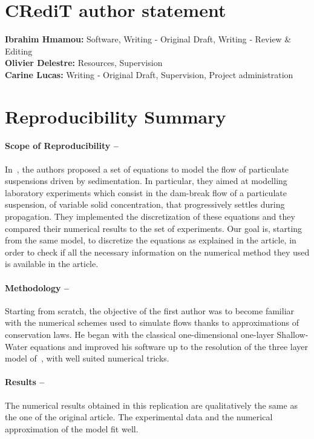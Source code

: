 \medskip


\section*{CRediT author statement}
\textbf{Ibrahim Hmamou:} Software, Writing ‐ Original Draft, Writing ‐ Review \& Editing \\
\textbf{Olivier Delestre:} Resources, Supervision\\
\textbf{Carine Lucas:} Writing ‐ Original Draft, Supervision, Project administration

\section*{Reproducibility Summary}

\paragraph{Scope of Reproducibility --}In~\cite{Andrea}, the authors proposed a set of equations to model the flow of particulate suspensions driven by sedimentation. In particular, they aimed at modelling laboratory experiments which consist in the dam-break flow of a particulate suspension, of variable solid concentration, that progressively settles during propagation. They implemented the discretization of these equations and they compared their numerical results to the set of experiments.
Our goal is, starting from the same model, to discretize the equations as explained in the article, in order to check if all the necessary information on the numerical method they used is available in the article.

\paragraph{Methodology --}Starting from scratch, the objective of the first author was to become familiar with the numerical schemes used to simulate flows thanks to approximations of conservation laws.
He began with the classical one-dimensional one-layer Shallow-Water equations and improved his software up to the resolution of the three layer model of~\cite{Andrea}, with well suited numerical tricks.

\paragraph{Results --}The numerical results obtained in this replication are qualitatively the same as the one of the original article. The experimental data and the numerical approximation of the model fit well.

